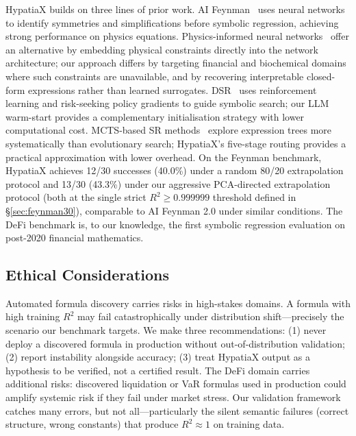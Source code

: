 \documentclass[twoside,11pt]{article}
\newcommand{\Rsq}{R^{2}}
\begin{document}
HypatiaX builds on three lines of prior work. AI Feynman~\citep{udrescu2020ai} uses neural networks to identify symmetries and simplifications before symbolic regression, achieving strong performance on physics equations. Physics-informed neural networks~\citep{raissi2019physics,karniadakis2021physics} offer an alternative by embedding physical constraints directly into the network architecture; our approach differs by targeting financial and biochemical domains where such constraints are unavailable, and by recovering interpretable closed-form expressions rather than learned surrogates. DSR~\citep{petersen2021deep,landajuela2022unified} uses reinforcement learning and risk-seeking policy gradients to guide symbolic search; our LLM warm-start provides a complementary initialisation strategy with lower computational cost. MCTS-based SR methods~\citep{sun2022symbolic} explore expression trees more systematically than evolutionary search; HypatiaX's five-stage routing provides a practical approximation with lower overhead. On the Feynman benchmark, HypatiaX achieves 12/30 successes (40.0\%) under a random 80/20 extrapolation protocol and 13/30 (43.3\%) under our aggressive PCA-directed extrapolation protocol (both at the single strict $\Rsq \geq 0.999999$ threshold defined in \S\ref{sec:feynman30}), comparable to AI Feynman 2.0 under similar conditions. The DeFi benchmark is, to our knowledge, the first symbolic regression evaluation on post-2020 financial mathematics.

\subsection{Ethical Considerations}\label{subsec:ethical-considerations}
\label{sec:disc_ethics}

Automated formula discovery carries risks in high-stakes domains. A formula with high training $\Rsq$ may fail catastrophically under distribution shift---precisely the scenario our benchmark targets. We make three recommendations: (1) never deploy a discovered formula in production without out-of-distribution validation; (2) report instability alongside accuracy; (3) treat HypatiaX output as a hypothesis to be verified, not a certified result. The DeFi domain carries additional risks: discovered liquidation or VaR formulas used in production could amplify systemic risk if they fail under market stress. Our validation framework catches many errors, but not all---particularly the silent semantic failures (correct structure, wrong constants) that produce $\Rsq \approx 1$ on training data.
\end{document}

